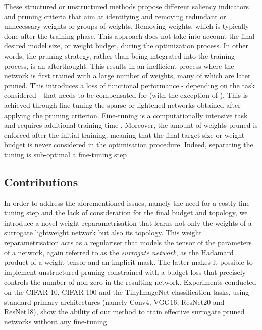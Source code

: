 These structured or unstructured methods propose different saliency indicators
and pruning criteria that aim at identifying and removing redundant or
unnecessary weights or groups of weights. Removing weights, which is typically
done after the training phase. This approach does not take into account the
final desired model size, or weight budget, during the optimization process. In
other words, the pruning strategy, rather than being integrated into the
training process, is an afterthought. This results in an inefficient process
where the network is first trained with a large number of weights, many of which
are later pruned. This introduces a loss of functional performance - depending
on the task considered - that needs to be compensated for (with the exception of
\cite{DBLP:conf/icml/KangH20,DBLP:conf/nips/HassibiS92}). This is achieved
through fine-tuning the sparse or lightened networks obtained after applying the
pruning criterion. Fine-tuning is a computationally intensive task and requires
additional training time
\cite{DBLP:conf/nips/HanPTD15,DBLP:journals/corr/HanMD15}. Moreover, the amount
of weights pruned is enforced after the initial training, meaning that the final
target size or weight budget is never considered in the optimisation procedure.
Indeed, separating the \DIFdelbegin {}\DIFdelend \DIFaddbegin {}\DIFaddend tuning is
sub-optimal \DIFdelbegin {}\DIFdelend \DIFaddbegin {}\DIFaddend a fine-tuning step \DIFaddbegin {}\DIFaddend . \\

\subsection{Contributions}

In order to address the aforementioned issues, namely the need for a costly
fine-tuning step and the lack of consideration for the final budget and
topology, we introduce a novel weight reparametrisation that learns not only the
weights of a surrogate lightweight network but also its topology. This weight
reparametrisation acts as a regulariser that models the tensor of the parameters
of a network, again referred to as the \textit{surrogate network}, as the
Hadamard product of a weight tensor and an implicit mask. The latter makes it
possible to implement unstructured pruning constrained with a budget loss that
precisely controls the number of non-zero \DIFdelbegin {}\DIFdelend \DIFaddbegin {}\DIFaddend in the resulting network.
Experiments conducted on the CIFAR-10, CIFAR-100 and the TinyImageNet
classification tasks, using standard primary architectures (namely Conv4, VGG16,
ResNet20 and ResNet18), show the ability of our method to train effective
surrogate pruned networks without any fine-tuning.\\

